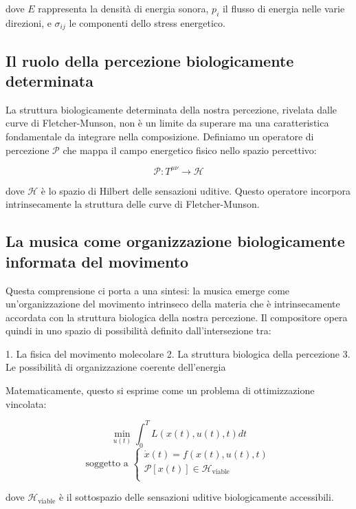 \documentclass[a4paper,11pt]{article}
\begin{document}
dove \(E\) rappresenta la densità di energia sonora, \(p_i\) il flusso
di energia nelle varie direzioni, e \(\sigma_{ij}\) le componenti dello
stress energetico.

\subsection{Il ruolo della percezione biologicamente
determinata}\label{il-ruolo-della-percezione-biologicamente-determinata}

La struttura biologicamente determinata della nostra percezione,
rivelata dalle curve di Fletcher-Munson, non è un limite da superare ma
una caratteristica fondamentale da integrare nella composizione.
Definiamo un operatore di percezione \(\mathcal{P}\) che mappa il campo
energetico fisico nello spazio percettivo:

\[\mathcal{P}: T^{\mu\nu} \rightarrow \mathcal{H}\]

dove \(\mathcal{H}\) è lo spazio di Hilbert delle sensazioni uditive.
Questo operatore incorpora intrinsecamente la struttura delle curve di
Fletcher-Munson.

\subsection{La musica come organizzazione biologicamente informata del
movimento}\label{la-musica-come-organizzazione-biologicamente-informata-del-movimento}

Questa comprensione ci porta a una sintesi: la musica emerge come
un'organizzazione del movimento intrinseco della materia che è
intrinsecamente accordata con la struttura biologica della nostra
percezione. Il compositore opera quindi in uno spazio di possibilità
definito dall'intersezione tra:

1. La fisica del movimento molecolare 2. La struttura biologica della
percezione 3. Le possibilità di organizzazione coerente dell'energia

Matematicamente, questo si esprime come un problema di ottimizzazione
vincolata:

\[\min_{u(t)} \int_0^T L(x(t), u(t), t)dt\]
\[\text{soggetto a } \begin{cases}
\dot{x}(t) = f(x(t), u(t), t) \\
\mathcal{P}[x(t)] \in \mathcal{H}_{\text{viable}} \\
\end{cases}\]

dove \(\mathcal{H}_{\text{viable}}\) è il sottospazio delle sensazioni
uditive biologicamente accessibili.
\end{document}
